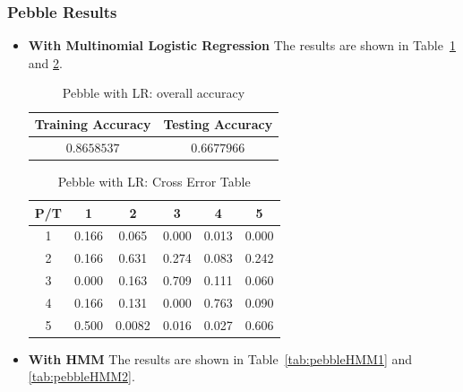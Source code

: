 \subsubsection{Pebble Results}
\label{subsec:pebbleresult}
\begin{itemize}
\item \textbf{With Multinomial Logistic Regression} 
The results are shown in Table~\ref{tab:pebbleLR1} and \ref{tab:pebbleLR2}.

\begin{table}[!htb]
\begin{center}
\begin{tabular}{c|c}
      \hline
      Training Accuracy & Testing Accuracy\\
      \hline
      $0.8658537$ & $0.6677966$ \\
      \hline
\end{tabular}
\caption{Pebble with LR: overall accuracy}
\label{tab:pebbleLR1}
\end{center}
\end{table}

\begin{table}[!htb]
\begin{center}
\begin{tabular}{c|c|c|c|c|c}
      \hline
      P/T& 1 & 2 &3 & 4 & 5 \\
      \hline
      1 &0.166&0.065&0.000&0.013&0.000\\
      2 &0.166&0.631&0.274&0.083&0.242\\
      3 &0.000&0.163&0.709&0.111&0.060\\
      4 &0.166&0.131&0.000&0.763&0.090\\
      5 &0.500&0.0082&0.016&0.027&0.606\\
      \hline
\end{tabular}
\caption{Pebble with LR: Cross Error Table}
\label{tab:pebbleLR2}
\end{center}
\end{table}

\item \textbf{With HMM}
The results are shown in Table~\ref{tab:pebbleHMM1} and \ref{tab:pebbleHMM2}.


\end{itemize}
